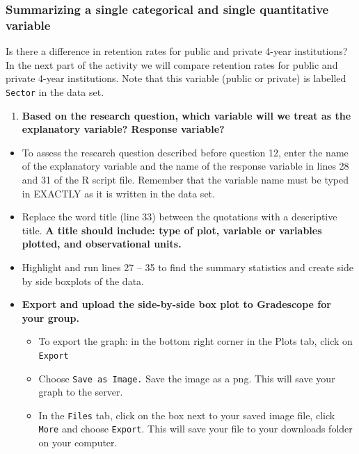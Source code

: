 \documentclass[
]{report}
\providecommand{\tightlist}{%
  \setlength{\itemsep}{0pt}\setlength{\parskip}{0pt}}
\begin{document}
\vspace{0.5in}

\hypertarget{summarizing-a-single-categorical-and-single-quantitative-variable}{%
\subsubsection*{Summarizing a single categorical and single quantitative variable}\label{summarizing-a-single-categorical-and-single-quantitative-variable}}

Is there a difference in retention rates for public and private 4-year institutions? In the next part of the activity we will compare retention rates for public and private 4-year institutions. Note that this variable (public or private) is labelled \texttt{Sector} in the data set.

\begin{enumerate}
\def\labelenumi{\arabic{enumi}.}
\setcounter{enumi}{11}
\tightlist
\item
  \textbf{Based on the research question, which variable will we treat as the explanatory variable? Response variable?}
\end{enumerate}

\vspace{0.8in}

\begin{itemize}
\item
  To assess the research question described before question 12, enter the name of the explanatory variable and the name of the response variable in lines 28 and 31 of the R script file. Remember that the variable name must be typed in EXACTLY as it is written in the data set.
\item
  Replace the word title (line 33) between the quotations with a descriptive title. \textbf{A title should include: type of plot, variable or variables plotted, and observational units.}
\item
  Highlight and run lines 27 -- 35 to find the summary statistics and create side by side boxplots of the data.
\item
  \textbf{Export and upload the side-by-side box plot to Gradescope for your group.}

  \begin{itemize}
  \item
    To export the graph: in the bottom right corner in the Plots tab, click on \texttt{Export}
  \item
    Choose \texttt{Save\ as\ Image.} Save the image as a png. This will save your graph to the server.
  \item
    In the \texttt{Files} tab, click on the box next to your saved image file, click \texttt{More} and choose \texttt{Export}. This will save your file to your downloads folder on your computer.
  \end{itemize}
\end{itemize}
\end{document}
